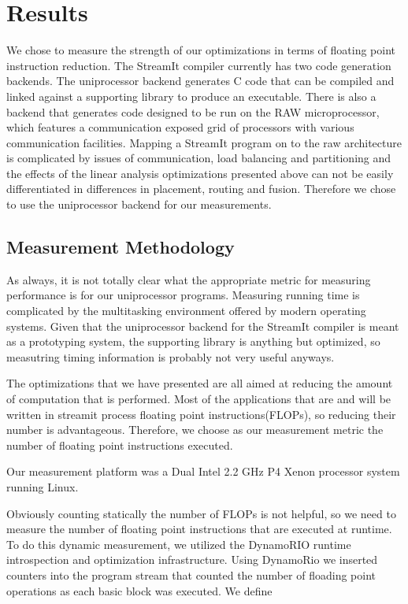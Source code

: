 \section{Results}
We chose to measure the strength of our optimizations in terms of 
floating point instruction reduction. The StreamIt compiler currently
has two code generation backends. The uniprocessor backend generates C code
that can be compiled and linked against a supporting library to produce an
executable. There is also a backend that generates code designed to be 
run on the RAW microprocessor\cite{waingold97baring, raw-micro}, which features
a communication exposed grid of processors with various communication facilities. 
Mapping a StreamIt program on to the raw architecture is complicated
by issues of communication, load balancing and partitioning\cite{streamit-asplos}
and the effects of the linear analysis optimizations presented above can not
be easily differentiated in differences in placement, routing and fusion. Therefore
we chose to use the uniprocessor backend for our measurements.

\subsection{Measurement Methodology}
As always, it is not totally clear what the appropriate metric for measuring performance
is for our uniprocessor programs. Measuring running time is complicated by the multitasking
environment offered by modern operating systems. Given that the uniprocessor backend for
the StreamIt compiler is meant as a prototyping system, the supporting library is anything
but optimized, so measutring timing information is probably not very useful anyways.

The optimizations that we have presented are all aimed at reducing the amount of 
computation that is performed. Most of the applications that are and will
be written in streamit process floating point instructions(FLOPs), so reducing their
number is advantageous. Therefore, we choose as our measurement metric the number of 
floating point instructions executed.

Our measurement platform was a Dual Intel 2.2 GHz P4 Xenon processor system 
running Linux.

Obviously counting statically the number of FLOPs is not helpful, so we need to
measure the number of floating point instructions that are executed at runtime.
To do this dynamic measurement, we utilized the DynamoRIO\cite{rio-webpage}
runtime introspection and optimization infrastructure. Using DynamoRio we
inserted counters into the program stream that counted the number of floading point
operations as each basic block was executed. We define

